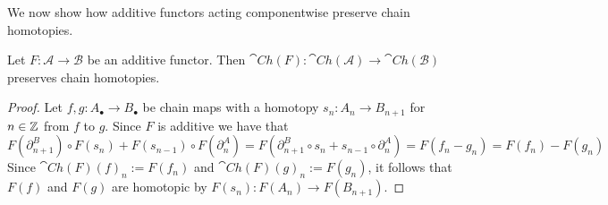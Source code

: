 



We now show how additive functors acting componentwise preserve chain homotopies.

\begin{lem}[label=lem:addFuncPres]
    Let $F:\mathcal{A}\to \mathcal{B}$ be an additive functor. Then $\cat{Ch}(F):\cat{Ch}(\mathcal{A})\to \cat{Ch}(\mathcal{B})$ preserves chain homotopies.
\end{lem}
\begin{proof}
    Let $f,g:A_\bullet\to B_\bullet$ be chain maps with a homotopy $s_n:A_n\to B_{n+1}$ for $n \in \mathbb Z$ from $f$ to $g$. Since $F$ is additive we have that
    \begin{equation*}
        F(\partial_{n+1}^B)\circ F(s_n)+F(s_{n-1})\circ F(\partial_n^A) = F(\partial_{n+1}^B\circ s_n+s_{n-1}\circ \partial_n^A) = F(f_n-g_n) = F(f_n)-F(g_n)
    \end{equation*}
    Since $\cat{Ch}(F)(f)_n := F(f_n)$ and $\cat{Ch}(F)(g)_n := F(g_n)$, it follows that $F(f)$ and $F(g)$ are homotopic by $F(s_n):F(A_n)\to F(B_{n+1})$.
\end{proof}

